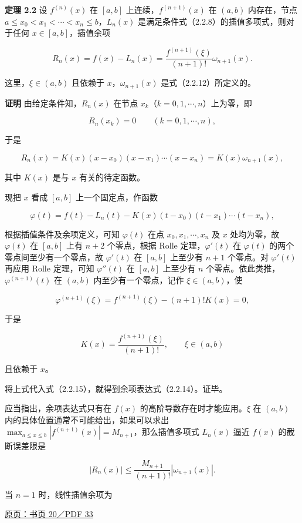 \documentclass[
  10pt,
  fontset=fandol]{ctexart}
\begin{document}
\textbf{定理 2.2} 设 \(f^{(n)}(x)\) 在 \([a,b]\) 上连续，\(f^{(n+1)}(x)\) 在 \((a,b)\) 内存在，节点 \(a\le x_0<x_1<\cdots<x_n\le b\)，\(L_n(x)\) 是满足条件式（2.2.8）的插值多项式，则对于任何 \(x\in[a,b]\)，插值余项

\[
R_n(x)=f(x)-L_n(x)=\frac{f^{(n+1)}(\xi)}{(n+1)!}\omega_{n+1}(x).
\tag{2.2.14}
\]

这里，\(\xi\in(a,b)\) 且依赖于 \(x\)，\(\omega_{n+1}(x)\) 是式（2.2.12）所定义的。

\textbf{证明} 由给定条件知，\(R_n(x)\) 在节点 \(x_k\)（\(k=0,1,\cdots,n\)）上为零，即

\[
R_n(x_k)=0\qquad(k=0,1,\cdots,n),
\]

于是

\[
R_n(x)=K(x)(x-x_0)(x-x_1)\cdots(x-x_n)=K(x)\omega_{n+1}(x),
\tag{2.2.15}
\]

其中 \(K(x)\) 是与 \(x\) 有关的待定函数。

现把 \(x\) 看成 \([a,b]\) 上一个固定点，作函数

\[
\varphi(t)=f(t)-L_n(t)-K(x)(t-x_0)(t-x_1)\cdots(t-x_n),
\]

根据插值条件及余项定义，可知 \(\varphi(t)\) 在点 \(x_0,x_1,\cdots,x_n\) 及 \(x\) 处均为零，故 \(\varphi(t)\) 在 \([a,b]\) 上有 \(n+2\) 个零点，根据 Rolle 定理，\(\varphi'(t)\) 在 \(\varphi(t)\) 的两个零点间至少有一个零点，故 \(\varphi'(t)\) 在 \([a,b]\) 上至少有 \(n+1\) 个零点。对 \(\varphi'(t)\) 再应用 Rolle 定理，可知 \(\varphi''(t)\) 在 \([a,b]\) 上至少有 \(n\) 个零点。依此类推，\(\varphi^{(n+1)}(t)\) 在 \((a,b)\) 内至少有一个零点，记作 \(\xi\in(a,b)\)，使

\[
\varphi^{(n+1)}(\xi)=f^{(n+1)}(\xi)-(n+1)!K(x)=0,
\]

于是

\[
K(x)=\frac{f^{(n+1)}(\xi)}{(n+1)!},\qquad \xi\in(a,b)
\]

且依赖于 \(x\)。

将上式代入式（2.2.15），就得到余项表达式（2.2.14）。证毕。

应当指出，余项表达式只有在 \(f(x)\) 的高阶导数存在时才能应用。\(\xi\) 在 \((a,b)\) 内的具体位置通常不可能给出，如果可以求出 \(\max_{a\le x\le b}|f^{(n+1)}(x)|=M_{n+1}\)，那么插值多项式 \(L_n(x)\) 逼近 \(f(x)\) 的截断误差限是

\[
|R_n(x)|\le\frac{M_{n+1}}{(n+1)!}|\omega_{n+1}(x)|.
\tag{2.2.16}
\]

当 \(n=1\) 时，线性插值余项为

\href{../../source-images/pdf-033.jpeg}{原页：书页 20／PDF 33}
\end{document}
